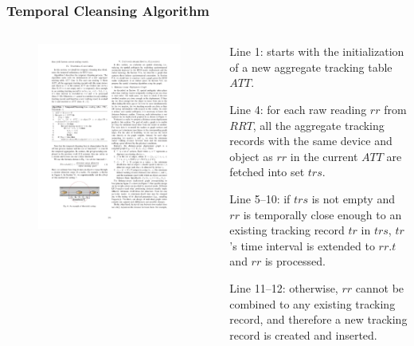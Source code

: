 
\begin{frame}
\frametitle{Temporal Cleansing Algorithm}

\begin{columns}[c]

  \begin{figure}[tb]
    \includegraphics[width=\columnwidth]{figures/3-2/3-2-7.pdf}
  \end{figure}

  \begin{sitemize}
    \item Line 1: starts with the initialization of a new aggregate tracking table $ATT$.
    \item Line 4: for each raw reading $rr$ from $RRT$, all the aggregate tracking records with the same device and object as $rr$ in the current $ATT$ are fetched into set $trs$.
    \item Line 5--10: if $trs$ is not empty and $rr$ is temporally close enough to an existing tracking record $tr$ in $trs$, $tr$'s time interval is extended to $rr.t$ and $rr$ is processed.
    \item Line 11--12: otherwise, $rr$ cannot be combined to any existing tracking record, and therefore a new tracking record is created and inserted.
  \end{sitemize}

\end{columns}

\end{frame}

